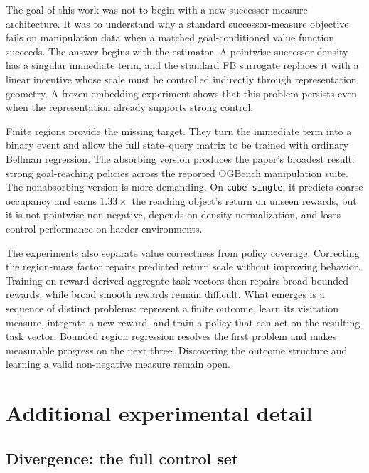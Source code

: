 \documentclass{article}
\begin{document}
The goal of this work was not to begin with a new successor-measure architecture.
It was to understand why a standard successor-measure objective fails on
manipulation data when a matched goal-conditioned value function succeeds. The
answer begins with the estimator. A pointwise successor density has a singular
immediate term, and the standard FB surrogate replaces it with a linear incentive
whose scale must be controlled indirectly through representation geometry. A
frozen-embedding experiment shows that this problem persists even when the
representation already supports strong control.

Finite regions provide the missing target. They turn the immediate term into a
binary event and allow the full state--query matrix to be trained with ordinary
Bellman regression. The absorbing version produces the paper's broadest result:
strong goal-reaching policies across the reported OGBench manipulation suite. The
nonabsorbing version is more demanding. On \texttt{cube-single}, it predicts
coarse occupancy and earns $1.33\times$ the reaching object's return on unseen
rewards, but it is not pointwise non-negative, depends on density normalization,
and loses control performance on harder environments.

The experiments also separate value correctness from policy coverage. Correcting
the region-mass factor repairs predicted return scale without improving behavior.
Training on reward-derived aggregate task vectors then repairs broad bounded
rewards, while broad smooth rewards remain difficult. What emerges is a sequence
of distinct problems: represent a finite outcome, learn its visitation measure,
integrate a new reward, and train a policy that can act on the resulting task
vector. Bounded region regression resolves the first problem and makes measurable
progress on the next three. Discovering the outcome structure and learning a
valid non-negative measure remain open.




\appendix
\section{Additional experimental detail}
\label{app:detail}

\subsection{Divergence: the full control set}
\label{app:diverge}
\end{document}

